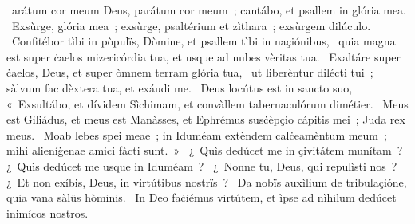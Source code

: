 { }
{%
~arátum cor meum Deus, parátum cor meum~; cantábo, et psallem in glória mea. 
~Exsùrge, glória mea~; exsùrge, psaltérium et zìthara~; exsùrgem dilúculo. 
~Confitébor tìbi in pòpulïs, Dòmine, et psallem tìbi in naçiónibus, 
~quia magna est super ċaelos mizericórdia tua, et usque ad nubes vèritas tua. 
~Exaltáre super ċaelos, Deus, et super òmnem terram glória tua, 
~ut liberèntur dilécti tui~; sàlvum fac dèxtera tua, et exáudi me. 
~Deus locútus est in sancto suo, «~Exsultábo, et dívidem Sìchimam, et convàllem tabernaculórum dimétier. 
~Meus est Giliádus, et meus est Manàsses, et Ephrémus susċèpçio cápitis mei~; Juda rex meus. 
~Moab lebes spei meae~; in Iduméam extèndem calċeamèntum meum~; mìhi alieníġenae amici fàcti sunt.~»
~¿~Quìs dedúcet me in çivitátem munítam~? ¿~Quìs dedúcet me usque in Iduméam~? 
~¿~Nonne tu, Deus, qui repulìsti nos~? ¿~Et non exíbis, Deus, in virtútibus nostrïs~? 
~Da nobïs auxìlium de tribulaçióne, quia vana sàlüs hòminis. 
~In Deo faċiémus virtútem, et ìpse ad nìhilum dedúcet inimícos nostros. 
}

